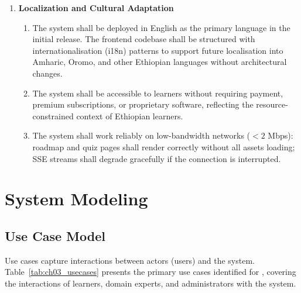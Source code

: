 \begin{enumerate}
    \item[\textbf{NFR7:}] \textbf{Localization and Cultural Adaptation}
        \begin{enumerate}
            \item[\textbf{NFR7.1:}] The system shall be deployed in English as the primary language in the initial release. The frontend codebase shall be structured with internationalisation (i18n) patterns to support future localisation into Amharic, Oromo, and other Ethiopian languages without architectural changes.
            \item[\textbf{NFR7.2:}] The system shall be accessible to learners without requiring payment, premium subscriptions, or proprietary software, reflecting the resource-constrained context of Ethiopian learners.
            \item[\textbf{NFR7.3:}] The system shall work reliably on low-bandwidth networks (\(<2\) Mbps): roadmap and quiz pages shall render correctly without all assets loading; SSE streams shall degrade gracefully if the connection is interrupted.
        \end{enumerate}
\end{enumerate}

\section{System Modeling}

\subsection{Use Case Model}

Use cases capture interactions between actors (users) and the system. Table~\ref{tab:ch03_usecases} presents the primary use cases identified for \projectname{}, covering the interactions of learners, domain experts, and administrators with the system.

